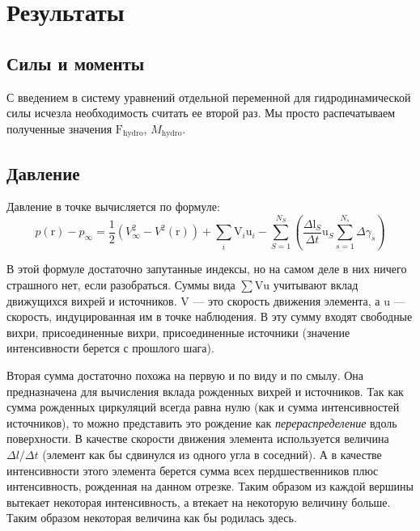 \documentclass[14pt]{extreport}
\newcommand{\br}[1]{\boldsymbol{\mathrm{#1}}}
\renewcommand{\vec}[1]{\br{#1}}
\begin{document}
\section{Результаты}
\subsection{Силы и моменты}

С введением в систему уравнений отдельной переменной для гидродинамической силы исчезла необходимость считать ее второй раз. Мы просто распечатываем полученные значения $\vec F_\text{hydro}$, $M_\text{hydro}$.


\subsection{Давление}
Давление в точке вычисляется по формуле:
\begin{equation}
p(\vec r) - p_\infty =
\frac{1}{2} \left( V^2_\infty - V^2(\vec r) \right) 
+ \sum\limits_i{\vec V_i \vec u_i}
-\sum\limits_{S=1}^{N_S}
{
\left (
	\frac{\Delta \vec l_S}{\Delta t} \vec u_S \sum_{s=1}^{N_s} {\Delta\gamma_s}
\right )
}
\end{equation}

В этой формуле достаточно запутанные индексы, но на самом деле в них ничего страшного нет, если разобраться.
Суммы вида $\sum \vec V \vec u$ учитывают вклад движущихся вихрей и источников. $\vec V$ --- это скорость движения элемента, а $\vec u$ --- скорость, индуцированная им в точке наблюдения.
В эту сумму входят свободные вихри, присоединенные вихри, присоединенные источники (значение интенсивности берется с прошлого шага).

Вторая сумма достаточно похожа на первую и по виду и по смылу. Она предназначена для вычисления вклада рожденных вихрей и источников. Так как сумма рожденных циркуляций всегда равна нулю (как и сумма интенсивностей источников), то можно представить это рождение как \textit{перераспределение} вдоль поверхности. В качестве скорости движения элемента используется величина ${\Delta l}/{\Delta t}$ (элемент как бы сдвинулся из одного угла в соседний). А в качестве интенсивности этого элемента берется сумма всех пердшественников плюс интенсивность, рожденная на данном отрезке.
Таким образом из каждой вершины вытекает некоторая интенсивность, а втекает на некоторую величину больше. Таким образом некоторая величина как бы родилась здесь.
\end{document}
